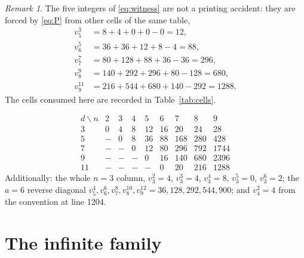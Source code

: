 \documentclass[11pt]{amsart}
\theoremstyle{remark}
\newtheorem*{remark}{Remark}
\begin{document}
\begin{remark}
The five integers of \eqref{eq:witness} are not a printing accident: they are
forced by \eqref{eq:P} from other cells of the same table,
\begin{align*}
 v_5^3&=8+4+0+0-0=12,\\
 v_6^5&=36+36+12+8-4=88,\\
 v_7^7&=80+128+88+36-36=296,\\
 v_8^9&=140+292+296+80-128=680,\\
 v_9^{11}&=216+544+680+140-292=1288 .
\end{align*}
The cells consumed here are recorded in Table~\ref{tab:cells}.
\end{remark}

\begin{table}[ht]
\caption{Cells of the degree-distribution table of~\cite{CHOPTY} quoted in
this note. A dash is a printed blank, read as $0$. Rows are indexed by the
degree $d$ and columns by $n=2,\dots,9$.}
\label{tab:cells}
\[
\begin{array}{r|rrrrrrrr}
 d\backslash n & 2 & 3 & 4 & 5 & 6 & 7 & 8 & 9\\\hline
 3  & 0 & 4 & 8 & 12 & 16 & 20 & 24 & 28\\
 5  & - & 0 & 8 & 36 & 88 & 168 & 280 & 428\\
 7  & - & - & 0 & 12 & 80 & 296 & 792 & 1744\\
 9  & - & - & - & 0 & 16 & 140 & 680 & 2396\\
 11 & - & - & - & - & 0 & 20 & 216 & 1288
\end{array}
\]
\medskip
Additionally: the whole $n=3$ column, $v_3^2=4$, $v_3^3=4$, $v_3^4=8$,
$v_3^5=0$, $v_3^6=2$; the $a=6$ reverse diagonal
$v_5^4,v_6^6,v_7^8,v_8^{10},v_9^{12}=36,128,292,544,900$; and $v_4^2=4$ from
the convention at line 1204.
\end{table}

\section{The infinite family}
\end{document}

